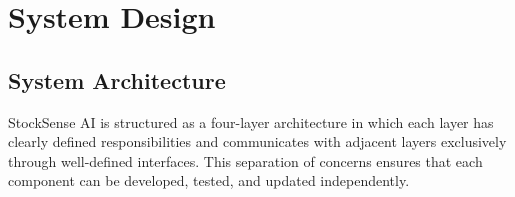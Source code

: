 \chapter{System Design}
\label{ch:design}

\section{System Architecture}

StockSense AI is structured as a four-layer architecture in which each layer has clearly
defined responsibilities and communicates with adjacent layers exclusively through well-defined
interfaces. This separation of concerns ensures that each component can be developed, tested,
and updated independently.

